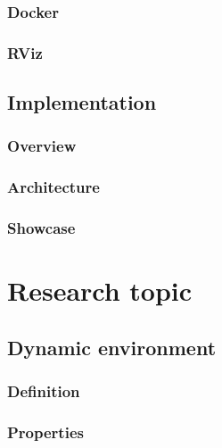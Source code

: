 \documentclass[12pt, a4paper]{report}
\begin{document}
      \subsection{Docker}
      
      \subsection{RViz}
      
    \section{Implementation}
    
      \subsection{Overview}
      
      \newpage
      \subsection{Architecture}
      
      \subsection{Showcase}
      

  \chapter{Research topic}
    
    \section{Dynamic environment}
    
      \subsection{Definition}
      
      \subsection{Properties}
      
      \newpage
\end{document}

